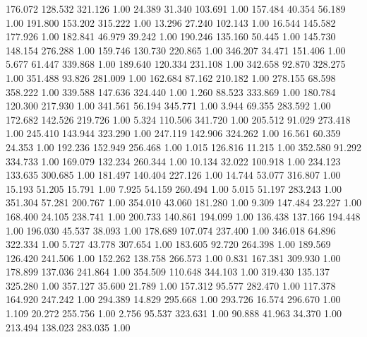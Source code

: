  176.072  128.532  321.126         1.00
  24.389   31.340  103.691         1.00
 157.484   40.354   56.189         1.00
 191.800  153.202  315.222         1.00
  13.296   27.240  102.143         1.00
  16.544  145.582  177.926         1.00
 182.841   46.979   39.242         1.00
 190.246  135.160   50.445         1.00
 145.730  148.154  276.288         1.00
 159.746  130.730  220.865         1.00
 346.207   34.471  151.406         1.00
   5.677   61.447  339.868         1.00
 189.640  120.334  231.108         1.00
 342.658   92.870  328.275         1.00
 351.488   93.826  281.009         1.00
 162.684   87.162  210.182         1.00
 278.155   68.598  358.222         1.00
 339.588  147.636  324.440         1.00
   1.260   88.523  333.869         1.00
 180.784  120.300  217.930         1.00
 341.561   56.194  345.771         1.00
   3.944   69.355  283.592         1.00
 172.682  142.526  219.726         1.00
   5.324  110.506  341.720         1.00
 205.512   91.029  273.418         1.00
 245.410  143.944  323.290         1.00
 247.119  142.906  324.262         1.00
  16.561   60.359   24.353         1.00
 192.236  152.949  256.468         1.00
   1.015  126.816   11.215         1.00
 352.580   91.292  334.733         1.00
 169.079  132.234  260.344         1.00
  10.134   32.022  100.918         1.00
 234.123  133.635  300.685         1.00
 181.497  140.404  227.126         1.00
  14.744   53.077  316.807         1.00
  15.193   51.205   15.791         1.00
   7.925   54.159  260.494         1.00
   5.015   51.197  283.243         1.00
 351.304   57.281  200.767         1.00
 354.010   43.060  181.280         1.00
   9.309  147.484   23.227         1.00
 168.400   24.105  238.741         1.00
 200.733  140.861  194.099         1.00
 136.438  137.166  194.448         1.00
 196.030   45.537   38.093         1.00
 178.689  107.074  237.400         1.00
 346.018   64.896  322.334         1.00
   5.727   43.778  307.654         1.00
 183.605   92.720  264.398         1.00
 189.569  126.420  241.506         1.00
 152.262  138.758  266.573         1.00
   0.831  167.381  309.930         1.00
 178.899  137.036  241.864         1.00
 354.509  110.648  344.103         1.00
 319.430  135.137  325.280         1.00
 357.127   35.600   21.789         1.00
 157.312   95.577  282.470         1.00
 117.378  164.920  247.242         1.00
 294.389   14.829  295.668         1.00
 293.726   16.574  296.670         1.00
   1.109   20.272  255.756         1.00
   2.756   95.537  323.631         1.00
  90.888   41.963   34.370         1.00
 213.494  138.023  283.035         1.00
